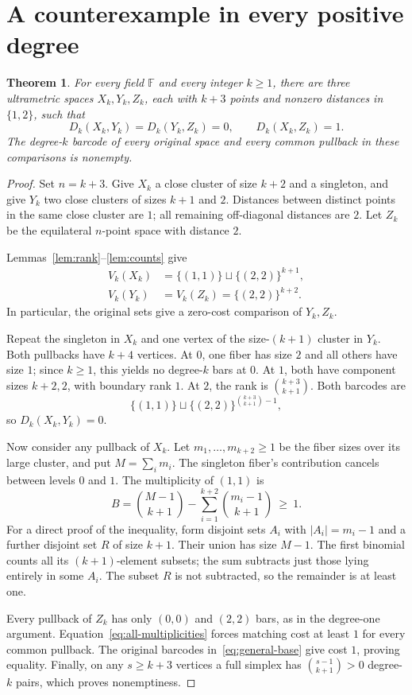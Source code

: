 \documentclass[11pt]{article}
\newtheorem{theorem}{Theorem}
\theoremstyle{remark}
\newcommand{\F}{\mathbb F}
\newcommand{\sq}{\sqcup}
\newcommand{\barc}[2]{\{(#1,#1)\}^{#2}}
\begin{document}
\section{A counterexample in every positive degree}
\begin{theorem}\label{thm:general}
For every field $\F$ and every integer $k\ge1$, there are three ultrametric
spaces $X_k,Y_k,Z_k$, each with $k+3$ points and nonzero distances in
$\{1,2\}$, such that
\[
D_k(X_k,Y_k)=D_k(Y_k,Z_k)=0,\qquad D_k(X_k,Z_k)=1.
\]
The degree-$k$ barcode of every original space and every common pullback
in these comparisons is nonempty.
\end{theorem}
\begin{proof}
Set $n=k+3$. Give $X_k$ a close cluster of size $k+2$ and a singleton,
and give $Y_k$ two close clusters of sizes $k+1$ and $2$.
Distances between distinct points in the same close cluster are $1$;
all remaining off-diagonal distances are $2$.
Let $Z_k$ be the equilateral $n$-point space with distance $2$.

Lemmas~\ref{lem:rank}--\ref{lem:counts} give
\begin{align}
V_k(X_k)&=\{(1,1)\}\sq\barc{2}{k+1},\label{eq:general-base}\\
V_k(Y_k)&=V_k(Z_k)=\barc{2}{k+2}.
\end{align}
In particular, the original sets give a zero-cost comparison of $Y_k,Z_k$.

Repeat the singleton in $X_k$ and one vertex of the size-$(k+1)$ cluster
in $Y_k$. Both pullbacks have $k+4$ vertices. At $0$, one fiber has size
$2$ and all others have size $1$; since $k\ge1$, this yields no degree-$k$
bars at $0$. At $1$, both have component sizes $k+2,2$, with boundary
rank $1$. At $2$, the rank is $\binom{k+3}{k+1}$. Both barcodes are
\begin{equation}
\{(1,1)\}\sq\barc{2}{\binom{k+3}{k+1}-1},
\end{equation}
so $D_k(X_k,Y_k)=0$.

Now consider any pullback of $X_k$. Let $m_1,\ldots,m_{k+2}\ge1$
be the fiber sizes over its large cluster, and put $M=\sum_i m_i$.
The singleton fiber's contribution cancels between levels $0$ and $1$.
The multiplicity of $(1,1)$ is
\begin{equation}
B=\binom{M-1}{k+1}-\sum_{i=1}^{k+2}\binom{m_i-1}{k+1}\ \ge\ 1.
\label{eq:all-multiplicities}
\end{equation}
For a direct proof of the inequality, form disjoint sets $A_i$ with
$|A_i|=m_i-1$ and a further disjoint set $R$ of size $k+1$.
Their union has size $M-1$. The first binomial counts all its
$(k+1)$-element subsets; the sum subtracts just those lying entirely
in some $A_i$. The subset $R$ is not subtracted, so the remainder is
at least one.

Every pullback of $Z_k$ has only $(0,0)$ and $(2,2)$ bars, as in the
degree-one argument. Equation~\eqref{eq:all-multiplicities} forces matching
cost at least $1$ for every common pullback. The original barcodes
in~\eqref{eq:general-base} give cost $1$, proving equality.
Finally, on any $s\ge k+3$ vertices a full simplex has
$\binom{s-1}{k+1}>0$ degree-$k$ pairs, which proves nonemptiness.
\end{proof}
\end{document}
